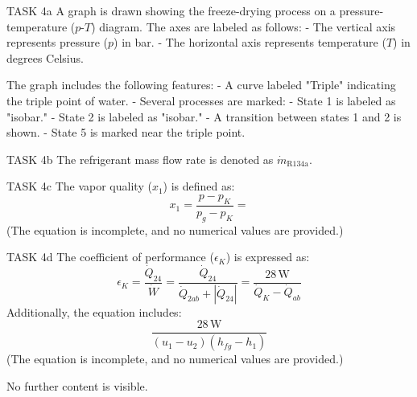 TASK 4a  
A graph is drawn showing the freeze-drying process on a pressure-temperature (\( p \)-\( T \)) diagram. The axes are labeled as follows:  
- The vertical axis represents pressure (\( p \)) in bar.  
- The horizontal axis represents temperature (\( T \)) in degrees Celsius.  

The graph includes the following features:  
- A curve labeled "Triple" indicating the triple point of water.  
- Several processes are marked:  
  - State 1 is labeled as "isobar."  
  - State 2 is labeled as "isobar."  
  - A transition between states 1 and 2 is shown.  
  - State 5 is marked near the triple point.  

TASK 4b  
The refrigerant mass flow rate is denoted as \( \dot{m}_{\text{R134a}} \).  

TASK 4c  
The vapor quality (\( x_1 \)) is defined as:  
\[
x_1 = \frac{p - p_K}{p_g - p_K} = 
\]  
(The equation is incomplete, and no numerical values are provided.)  

TASK 4d  
The coefficient of performance (\( \epsilon_K \)) is expressed as:  
\[
\epsilon_K = \frac{\dot{Q}_{24}}{\dot{W}} = \frac{\dot{Q}_{24}}{\dot{Q}_{2ab} + |\dot{Q}_{24}|} = \frac{28 \, \text{W}}{\dot{Q}_K - \dot{Q}_{ab}}
\]  
Additionally, the equation includes:  
\[
\frac{28 \, \text{W}}{(u_1 - u_2)(h_{fg} - h_1)}
\]  
(The equation is incomplete, and no numerical values are provided.)  

No further content is visible.